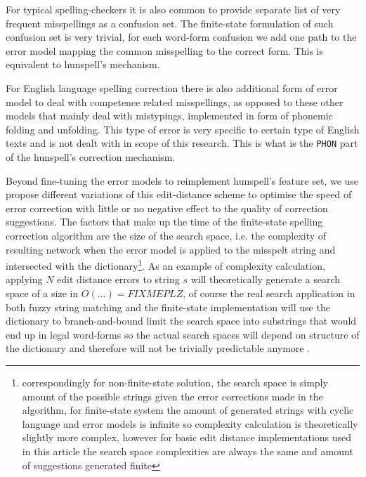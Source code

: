 \documentclass[11pt]{article}
\begin{document}
For typical spelling-checkers it is also common to provide separate list of
very frequent misspellings as a confusion set. The finite-state formulation
of such confusion set is very trivial, for each word-form confusion we add
one path to the error model mapping the common misspelling to the correct
form. This is equivalent to hunspell's \texttt{} mechanism.

For English language spelling correction there is also additional form of
error model to deal with competence related misspellings, as opposed to these
other models that mainly deal with mistypings, implemented in form of phonemic
folding and unfolding. This type of error is very specific to certain type of
English texts and is not dealt with in scope of this research. This is what is
the \texttt{PHON} part of the hunspell's correction mechanism.

Beyond fine-tuning the error models to reimplement hunspell's feature set, we
use propose different variations of this edit-distance scheme to optimise the
speed of error correction with little or no negative effect to the quality of
correction suggestions. The factors that make up the time of the finite-state
spelling correction algorithm are the size of the search space, i.e. the
complexity of resulting network when the error model is applied to the misspelt
string and intersected with the dictionary\footnote{correspondingly for
non-finite-state solution, the search space is simply amount of the possible
strings given the error corrections made in the algorithm, for finite-state
system the amount of generated strings with cyclic language and error models is
infinite so complexity calculation is theoretically slightly more complex,
however for basic edit distance implementations used in this article the search
space complexities are always the same and amount of suggestions generated
finite}. As an example of complexity calculation, applying $N$ edit distance
errors to string $s$ will theoretically generate a search space of a size in
$O(...) = FIXME PLZ$, \cite{mitankin/2005} of course the real search
application in both fuzzy string matching and the finite-state implementation
will use the dictionary to branch-and-bound limit the search space into
substrings that would end up in legal word-forms so the actual search spaces
will depend on structure of the dictionary and therefore will not be trivially
predictable anymore .
\end{document}
